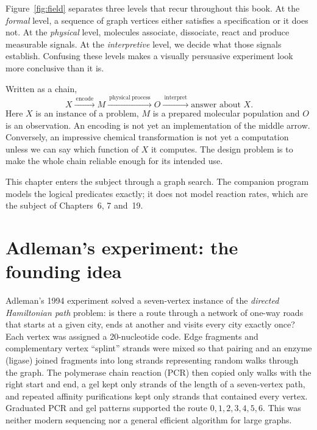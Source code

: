 Figure~\ref{fig:field} separates three levels that recur throughout this book.
At the \emph{formal} level, a sequence of graph vertices either satisfies a
specification or it does not. At the \emph{physical} level, molecules associate,
dissociate, react and produce measurable signals. At the \emph{interpretive}
level, we decide what those signals establish. Confusing these levels makes a
visually persuasive experiment look more conclusive than it is.


Written as a chain,
\[
 X\xrightarrow{\ \mathrm{encode}\ }M
 \xrightarrow{\ \mathrm{physical\ process}\ }O
 \xrightarrow{\ \mathrm{interpret}\ }\text{answer about }X.
\]
Here $X$ is an instance of a problem, $M$ is a prepared molecular population and
$O$ is an observation. An encoding is not yet an implementation of the middle
arrow. Conversely, an impressive chemical transformation is not yet a
computation unless we can say which function of $X$ it computes. The design
problem is to make the whole chain reliable enough for its intended use.

This chapter enters the subject through a graph search. The companion program
models the logical predicates exactly; it does not model reaction rates, which
are the subject of Chapters~6, 7 and~19.

\section{Adleman's experiment: the founding idea}\label{sec:history}
Adleman's 1994 experiment solved a seven-vertex instance of the
\emph{directed Hamiltonian path} problem: is there a route through a network of
one-way roads that starts at a given city, ends at another and visits every
city exactly once? Each vertex was assigned a 20-nucleotide code. Edge
fragments and complementary vertex ``splint'' strands were mixed so that pairing
and an enzyme (ligase) joined fragments into long strands representing random
walks through the graph. The polymerase chain reaction (PCR) then copied only
walks with the right start and end, a gel kept only strands of the length of a
seven-vertex path, and repeated affinity purifications kept only strands that
contained every vertex. Graduated PCR and gel patterns supported the route
$0,1,2,3,4,5,6$.\cite{Adleman1994} This was neither modern sequencing nor a
general efficient algorithm for large graphs.

